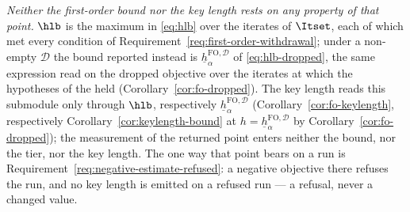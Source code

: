 \begin{remark}
\emph{Neither the first-order bound nor the key length rests on any
property of that point.} $\hlb$ is the maximum in \eqref{eq:hlb} over the
iterates of $\Itset$, each of which met every condition of
Requirement~\ref{req:first-order-withdrawal}; under a non-empty
 $\mathcal{D}$ the bound reported instead is
$\underline{h}^{\mathrm{FO},\mathcal{D}}_{\alpha}$ of
\eqref{eq:hlb-dropped}, the same expression read on the dropped objective
over the iterates at which the hypotheses of the 
held (Corollary~\ref{cor:fo-dropped}). The key length reads this submodule
only through $\hlb$, respectively
$\underline{h}^{\mathrm{FO},\mathcal{D}}_{\alpha}$
(Corollary~\ref{cor:fo-keylength}, respectively
Corollary~\ref{cor:keylength-bound} at
$h=\underline{h}^{\mathrm{FO},\mathcal{D}}_{\alpha}$ by
Corollary~\ref{cor:fo-dropped}); the measurement of the returned point
enters neither the bound, nor the tier, nor the key length. The one way that
point bears on a run is Requirement~\ref{req:negative-estimate-refused}: a
negative objective there refuses the run, and no key length is emitted on a
refused run --- a refusal, never a changed value.
\end{remark}
